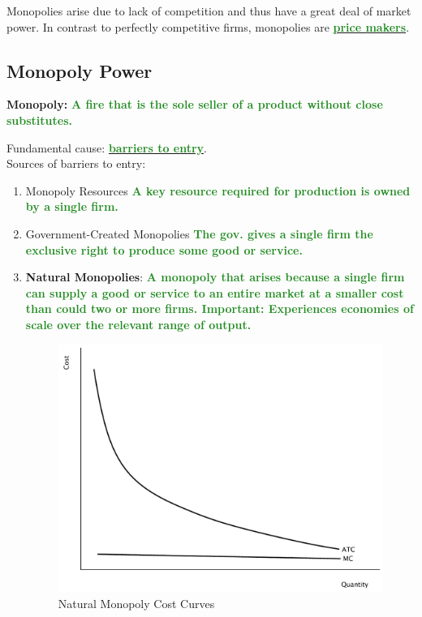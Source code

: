 \documentclass[11pt]{article}\usepackage[]{graphicx}\usepackage[]{color}
\theoremstyle{definition}
\newcommand{\ddp}[1]{{\textbf{\textcolor{ForestGreen}{#1}}}}
\newcommand{\dd}[1]{{\underline{\textbf{\textcolor{ForestGreen}{#1}}}}}
\newcommand{\defn}[1]{\textbf{#1}}
\begin{document}
	Monopolies arise due to lack of competition and thus have a great deal of market power. In contrast to perfectly competitive firms, monopolies are \dd{price makers}.
	
	\subsection{Monopoly Power}
	
	\defn{Monopoly:} \ddp{A fire that is the sole seller of a product without close substitutes.\\}
	
	Fundamental cause: \dd{barriers to entry}.
	\\
	
	Sources of barriers to entry:
	\begin{enumerate}
		\setlength\itemsep{1.5em}
		
		\item Monopoly Resources \ddp{A key resource required for production is owned by a single firm.}
		\item Government-Created Monopolies \ddp{The gov. gives a single firm the exclusive right to produce some good or service.}
		\item \defn{Natural Monopolies}: \ddp{A monopoly that arises because a single firm can supply a good or service to an entire market at a smaller cost than could two or more firms. Important: Experiences economies of scale over the relevant range of output.}
		
			\begin{figure}[H]
				\centering
				\includegraphics[scale=.40]{plot74.pdf}
				\caption{Natural Monopoly Cost Curves}
			\end{figure}
			
	\end{enumerate}
	
\end{document}
